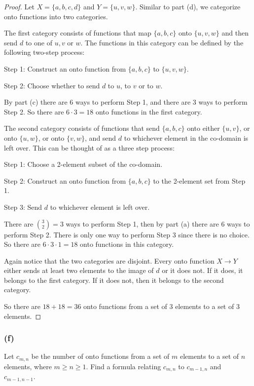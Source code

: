\documentclass[14pt]{extarticle}
\newcommand{\cy}{\color{cyan}}
\begin{document}
\begin{proof}
Let \(X = \{a, b, c, d\}\) and \(Y = \{u, v, w\}\). Similar to part (d), we categorize onto functions into two categories.

The first category consists of functions that map \(\{a,b,c\}\) onto \(\{u,v,w\}\) and then send \(d\) to one of \(u,v\) or
\(w\). The functions in this category can be defined by the following two-step process:

{\cy Step 1:} Construct an onto function from \(\{a, b, c\}\) to \(\{u, v, w\}\).

{\cy Step 2:} Choose whether to send \(d\) to \(u\), to \(v\) or to \(w\).

By part (c) there are 6 ways to perform Step 1, and there are 3 ways to perform Step 2. So there are \(6 \cdot 3 = 18\) onto
functions in the first category.

The second category consists of functions that send \(\{a,b,c\}\) onto either \(\{u,v\}\), or onto \(\{u,w\}\), or
onto \(\{v,w\}\), and send \(d\) to whichever element in the co-domain is left over. This can be thought of as a three step 
process:

{\cy Step 1:} Choose a 2-element subset of the co-domain.

{\cy Step 2:} Construct an onto function from \(\{a,b,c\}\) to the 2-element set from Step 1.

{\cy Step 3:} Send \(d\) to whichever element is left over.

There are \(\binom{3}{2} = 3\) ways to perform Step 1, then by part (a) there are 6 ways to perform Step 2. There is only one
way to perform Step 3 since there is no choice. So there are \(6 \cdot 3 \cdot 1 = 18\) onto functions in this category.

Again notice that the two categories are disjoint. Every onto function \(X \to Y\) either sends at least two elements to the
image of \(d\) or it does not. If it does, it belongs to the first category. If it does not, then it belongs to the second category.

So there are \(18+18 = 36\) onto functions from a set of 3 elements to a set of 3 elements.
\end{proof}

\subsubsection{(f)}
Let \(c_{m,n}\) be the number of onto functions from a set of \(m\) elements to a set of \(n\) elements, where 
\(m \geq n \geq 1\). Find a formula relating \(c_{m,n}\) to \(c_{m-1,n}\) and \(c_{m-1,n-1}\).
\end{document}
